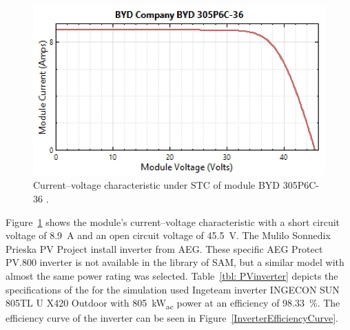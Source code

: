 \begin{figure}[htbp]  
\centering
\includegraphics[width=0.70\linewidth]{FIG/PVModuleVA}
\caption[Current–voltage characteristic under STC of module BYD 305P6C-36.]{Current–voltage characteristic under STC of module BYD 305P6C-36 \cite{NREL2015g}.}\label{PVModuleVA}
\end{figure}


Figure~\ref{PVModuleVA} shows the module’s current–voltage characteristic with a short circuit voltage of \SI{8.9}{A} and an open circuit voltage of \SI{45.5}{V}.\newpage\noindent
The Mulilo Sonnedix Prieska PV Project install inverter from AEG. These specific AEG Protect PV.800 inverter is not available in the library of SAM, but a similar model with almost the same power rating was selected. Table~\ref{tbl: PVinverter} depicts the specifications of the for the simulation used Ingeteam inverter INGECON SUN 805TL U X420 Outdoor with \SI{805}{kW}\textsubscript{ac} power at an efficiency of 98.33~\%. The efficiency curve of the inverter can be seen in Figure~\ref{InverterEfficiencyCurve}. 

